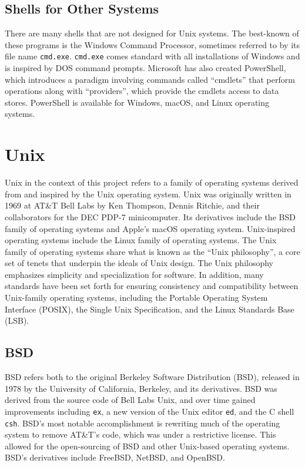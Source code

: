 \documentclass[12pt,twoside]{report} %
\begin{document}
	\subsection{Shells for Other Systems} \label{sec:shells-for-other-systems}
	There are many shells that are not designed for Unix systems. The best-known of these programs is the Windows Command Processor, sometimes referred to by its file name \verb|cmd.exe|. \verb|cmd.exe| comes standard with all installations of Windows and is inspired by DOS command prompts. Microsoft has also created PowerShell, which introduces a paradigm involving commands called “cmdlets” that perform operations along with “providers”, which provide the cmdlets access to data stores.\cite{powershell} PowerShell is available for Windows, macOS, and Linux operating systems.

	\section{Unix} \label{sec:unix}
	Unix in the context of this project refers to a family of operating systems derived from and inspired by the Unix operating system. Unix was originally written in 1969 at AT\&T Bell Labs by Ken Thompson, Dennis Ritchie, and their collaborators for the DEC PDP-7 minicomputer.\cite{unix} Its derivatives include the BSD family of operating systems and Apple's macOS operating system. Unix-inspired operating systems include the Linux family of operating systems. The Unix family of operating systems share what is known as the “Unix philosophy”, a core set of tenets that underpin the ideals of Unix design. The Unix philosophy emphasizes simplicity and specialization for software.\cite{philosophy} In addition, many standards have been set forth for ensuring consistency and compatibility between Unix-family operating systems, including the Portable Operating System Interface (POSIX), the Single Unix Specification, and the Linux Standards Base (LSB).\cite{standards}

	\subsection{BSD} \label{sec:bsd}
	BSD refers both to the original Berkeley Software Distribution (BSD), released in 1978 by the University of California, Berkeley, and its derivatives. BSD was derived from the source code of Bell Labs Unix, and over time gained improvements including \verb|ex|, a new version of the Unix editor \verb|ed|, and the C shell \verb|csh|.\cite{bsd-csrg} BSD's most notable accomplishment is rewriting much of the operating system to remove AT\&T's code, which was under a restrictive license.\cite{berkeley-unix} This allowed for the open-sourcing of BSD and other Unix-based operating systems. BSD's derivatives include FreeBSD, NetBSD, and OpenBSD.
\end{document}
